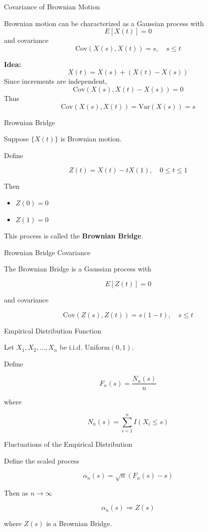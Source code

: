 \documentclass{beamer}
\begin{document}
	\begin{frame}{Covariance of Brownian Motion}
		
		Brownian motion can be characterized as a Gaussian process with
		\[
		E[X(t)] = 0
		\]
		and covariance
		\[
		\text{Cov}(X(s),X(t)) = s, \quad s \le t
		\]
		
		\textbf{Idea:}
		\[
		X(t) = X(s) + (X(t)-X(s))
		\]
		Since increments are independent,
		\[
		\text{Cov}(X(s),X(t)-X(s)) = 0
		\]
		Thus
		\[
		\text{Cov}(X(s),X(t)) = \text{Var}(X(s)) = s
		\]
	\end{frame}
	\begin{frame}{Brownian Bridge}
		
		Suppose $\{X(t)\}$ is Brownian motion.
		
		Define
		
		\[
		Z(t) = X(t) - tX(1), \quad 0 \le t \le 1
		\]
		
		Then
		
		\begin{itemize}
			\item $Z(0)=0$
			\item $Z(1)=0$
		\end{itemize}
		
		This process is called the \textbf{Brownian Bridge}.
		
	\end{frame}
	
	\begin{frame}{Brownian Bridge Covariance}
		
		The Brownian Bridge is a Gaussian process with
		
		\[
		E[Z(t)] = 0
		\]
		
		and covariance
		
		\[
		\text{Cov}(Z(s),Z(t)) = s(1-t), \quad s \le t
		\]
		
	\end{frame}
	\begin{frame}{Empirical Distribution Function}
		
		Let $X_1,X_2,\dots,X_n$ be i.i.d. Uniform$(0,1)$.
		
		Define
		
		\[
		F_n(s) = \frac{N_n(s)}{n}
		\]
		
		where
		
		\[
		N_n(s) = \sum_{i=1}^n I(X_i \le s)
		\]
		
	\end{frame}
	
	\begin{frame}{Fluctuations of the Empirical Distribution}
		
		Define the scaled process
		
		\[
		\alpha_n(s) = \sqrt{n}(F_n(s)-s)
		\]
		
		Then as $n \to \infty$
		
		\[
		\alpha_n(s) \Rightarrow Z(s)
		\]
		
		where $Z(s)$ is a Brownian Bridge.
		
	\end{frame}
	
\end{document}

